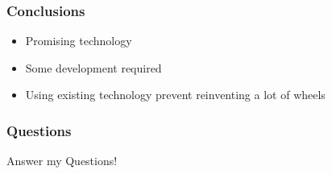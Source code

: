 \documentclass{beamer}
\begin{document}
\begin{frame}
\frametitle{Conclusions}

\begin{itemize}
\item Promising technology
\item Some development required
\item Using existing technology prevent reinventing a lot of wheels
\end{itemize}
\end{frame}

\begin{frame}
\frametitle{Questions}

Answer my Questions!

\end{frame}
\end{document}
